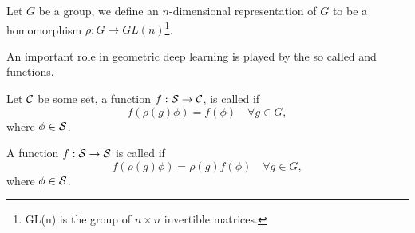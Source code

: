\documentclass[../3.tex]{subfiles}
\begin{document}
    \begin{defn}
        Let $G$ be a group, we define an $n$-dimensional representation of $G$ to be a homomorphism $\rho : G \to GL(n)$\footnote{GL(n) is the group of $n \times n$ invertible matrices.}.
    \end{defn}

    An important role in geometric deep learning is played by the so called  and  functions.

    \begin{defn}
        Let $\mathcal{C}$ be some set, a function $f : \mathcal{S} \to \mathcal{C}$, is called  if
        \[ f(\rho(g)\phi) = f(\phi) \quad \forall g \in G, \]
        where $\phi \in \mathcal{S}$.
   \end{defn}

   \begin{defn}
       A function $f : \mathcal{S} \to \mathcal{S}$ is called  if 
       \[ f(\rho(g)\phi) = \rho(g)f(\phi) \quad \forall g \in G, \]
       where $\phi \in \mathcal{S}$.
   \end{defn}
\end{document}
